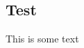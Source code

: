 \documentclass{cheatsheet}
\begin{document}
\begin{multicols}{2}
    \section{Test}
    This is some text
\end{multicols}
\end{document}
